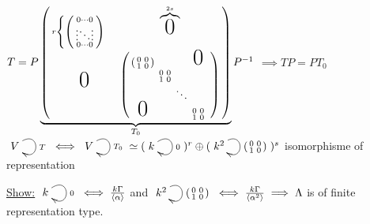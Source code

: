 \begin{exam}
$ T = P \underbrace{ \left(\begin{smallmatrix} r\begin{cases} \left(\begin{smallmatrix} 0 \cdots 0  \\\vdots \ddots \vdots \\0 \cdots 0 \end{smallmatrix}\right) \end{cases} & \overbrace{\text{\huge0}}^{2s}\\\text{\huge0} & 
\left(\begin{smallmatrix}  
\left( \begin{smallmatrix} 0 & 0\\ 1 & 0\\ \end{smallmatrix}\right) & & & \text{\huge0}  \\
& \begin{smallmatrix} 0 & 0\\ 1 & 0\\ \end{smallmatrix} & & \\
& &\ddots &  & \\
\text{\huge0} & & &\begin{smallmatrix} 0 & 0\\ 1 & 0\\ \end{smallmatrix} \\
\end{smallmatrix}\right) \end{smallmatrix}\right)}_{T_0}P^{-1} $ $\implies TP= PT_0$ \nolinebreak[4]\\\newline
$\xymatrix{V \ar@(ur,dr)^{T}} \iff \xymatrix{V \ar@(ur,dr)^{T_0}} \simeq (\xymatrix{k \ar@(ur,dr)^{0}})^r \oplus (\xymatrix{k^2 \ar@(ur,dr)^{\left(\begin{smallmatrix}0&0\\1&0\end{smallmatrix}\right)}})^s  $  isomorphisme of representation

\underline{Show:} $\xymatrix{k \ar@(ur,dr)^{0}} \iff \frac{k\G}{\langle\alpha\rangle}$ and $\xymatrix{k^2 \ar@(ur,dr)^{\left(\begin{smallmatrix}0&0\\1&0\end{smallmatrix}\right)}} \iff \frac{k\G}{\langle\alpha^2\rangle} \implies \Lambda$ is of finite representation type.
\end{exam}
